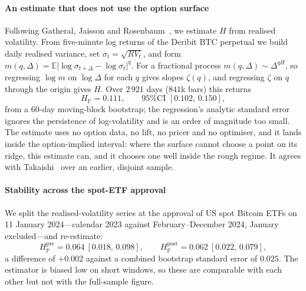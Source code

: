 \documentclass[preprint,12pt]{elsarticle}
\newif\ifrevtable
\begin{document}
\paragraph{An estimate that does not use the option surface}
Following Gatheral, Jaisson and Rosenbaum~\citep{gatheral2018volatility}, we
estimate $H$ from realised volatility. From five-minute log returns of the
Deribit BTC perpetual we build daily realised variance, set
$\sigma_t=\sqrt{RV_t}$, and form
$m(q,\Delta)=\mathbb{E}\bigl|\log\sigma_{t+\Delta}-\log\sigma_t\bigr|^{q}$. For a
fractional process $m(q,\Delta)\sim\Delta^{qH}$, so regressing $\log m$ on
$\log\Delta$ for each $q$ gives slopes $\zeta(q)$, and regressing $\zeta$ on $q$
through the origin gives $H$. Over $2\,921$ days ($841$k bars) this returns
\[
  H_{\mathbb{P}} = 0.111, \qquad \text{95\% CI } [0.102,\,0.150],
\]
from a $60$-day moving-block bootstrap; the regression's analytic standard error
ignores the persistence of log-volatility and is an order of magnitude too small.
The estimate uses no option data, no lift, no pricer and no optimiser, and it
lands inside the option-implied interval: where the surface cannot choose a point
on its ridge, this estimate can, and it chooses one well inside the rough regime.
It agrees with Takaishi~\citep{takaishi2020rough} over an earlier, disjoint
sample.

\paragraph{Stability across the spot-ETF approval}
We split the realised-volatility series at the approval of US spot Bitcoin ETFs
on 11 January 2024---calendar 2023 against February--December 2024, January
excluded---and re-estimate:
\[
  H_{\mathbb{P}}^{\text{pre}} = 0.064\ [0.018,\,0.098], \qquad
  H_{\mathbb{P}}^{\text{post}} = 0.062\ [0.022,\,0.079],
\]
a difference of $+0.002$ against a combined bootstrap standard error of $0.025$.
The estimator is biased low on short windows, so these are comparable with each
other but not with the full-sample figure.
\IfFileExists{tables/regime.tex}{\revtabletrue}{\revtablefalse}\ifrevtable
\end{document}
